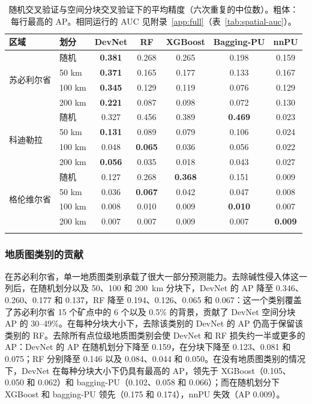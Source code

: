 \documentclass[pdflatex,sn-apa]{sn-jnl}
\begin{document}
\begin{table}[t]
\caption{随机交叉验证与空间分块交叉验证下的平均精度（六次重复的中位数）。粗体：每行最高的 AP。相同运行的 AUC 见附录~\ref{app:full}（表~\ref{tab:spatial-auc}）。}\label{tab:spatial}
\footnotesize
\setlength{\tabcolsep}{3pt}
\begin{tabular*}{\textwidth}{@{\extracolsep\fill}llccccc}
\toprule
区域 & 划分 & DevNet & RF & XGBoost & Bagging-PU & nnPU \\
\midrule
\multirow{4}{*}{苏必利尔省} & 随机 & \textbf{0.381} & 0.268 & 0.265 & 0.198 & 0.159 \\
 & 50 km & \textbf{0.371} & 0.165 & 0.177 & 0.133 & 0.167 \\
 & 100 km & \textbf{0.345} & 0.129 & 0.119 & 0.076 & 0.129 \\
 & 200 km & \textbf{0.221} & 0.087 & 0.098 & 0.072 & 0.130 \\
\midrule
\multirow{4}{*}{科迪勒拉} & 随机 & 0.327 & 0.456 & 0.389 & \textbf{0.469} & 0.023 \\
 & 50 km & \textbf{0.131} & 0.089 & 0.079 & 0.106 & 0.024 \\
 & 100 km & 0.048 & \textbf{0.065} & 0.036 & 0.056 & 0.022 \\
 & 200 km & \textbf{0.056} & 0.035 & 0.018 & 0.043 & 0.027 \\
\midrule
\multirow{4}{*}{格伦维尔省} & 随机 & 0.127 & 0.268 & \textbf{0.368} & 0.151 & 0.009 \\
 & 50 km & 0.036 & \textbf{0.067} & 0.042 & 0.047 & 0.008 \\
 & 100 km & 0.008 & 0.010 & 0.009 & \textbf{0.010} & 0.007 \\
 & 200 km & 0.007 & 0.007 & 0.009 & 0.007 & \textbf{0.009} \\
\botrule
\end{tabular*}
\end{table}

\subsubsection{地质图类别的贡献}\label{sec:res-featuresets}

在苏必利尔省，单一地质图类别承载了很大一部分预测能力。去除碱性侵入体这一列后，在随机划分以及 50、100 和 200~km 分块下，DevNet 的 AP 降至 0.346、0.260、0.177 和 0.137，RF 降至 0.194、0.126、0.065 和 0.067：这一个类别覆盖了苏必利尔省 15 个矿点中的 6 个以及 0.5\% 的背景，贡献了 DevNet 空间分块 AP 的 30--49\%。在每种分块大小下，去除该类别的 DevNet 的 AP 仍高于保留该类别的 RF。去除所有点位级地质图类别会使 DevNet 和 RF 损失约一半或更多的 AP：DevNet 的 AP 在随机划分下降至 0.159，在分块下降至 0.123、0.081 和 0.075；RF 分别降至 0.146 以及 0.084、0.044 和 0.050。在没有地质图类别的情况下，DevNet 在每种分块大小下仍具有最高的 AP，领先于 XGBoost（0.105、0.050 和 0.062）和 bagging-PU（0.102、0.058 和 0.066）；而在随机划分下 XGBoost 和 bagging-PU 领先（0.175 和 0.174），nnPU 失效（AP 0.009）。
\end{document}
